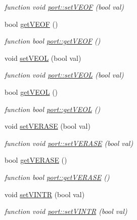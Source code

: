 \begin{DoxyCompactItemize}
\begin{DoxyCompactList}\small\item\em function void \hyperlink{classport_a84c056e9f04f4fd3dc4200f6ba7279de}{port\+::set\+V\+E\+OF} (bool val) \end{DoxyCompactList}\item 
bool \hyperlink{classport_a3dedfb7fd7aaeda7b85bcaaf40c1edc9}{get\+V\+E\+OF} ()
\begin{DoxyCompactList}\small\item\em function bool \hyperlink{classport_a3dedfb7fd7aaeda7b85bcaaf40c1edc9}{port\+::get\+V\+E\+OF} () \end{DoxyCompactList}\item 
void \hyperlink{classport_a99880c2c00863369ea5fa2e3fdfe8474}{set\+V\+E\+OL} (bool val)
\begin{DoxyCompactList}\small\item\em function void \hyperlink{classport_a99880c2c00863369ea5fa2e3fdfe8474}{port\+::set\+V\+E\+OL} (bool val) \end{DoxyCompactList}\item 
bool \hyperlink{classport_a381910916d501b1fde29803731dde7a5}{get\+V\+E\+OL} ()
\begin{DoxyCompactList}\small\item\em function bool \hyperlink{classport_a381910916d501b1fde29803731dde7a5}{port\+::get\+V\+E\+OL} () \end{DoxyCompactList}\item 
void \hyperlink{classport_abadd59db8333dd9793c267e55175a4fd}{set\+V\+E\+R\+A\+SE} (bool val)
\begin{DoxyCompactList}\small\item\em function void \hyperlink{classport_abadd59db8333dd9793c267e55175a4fd}{port\+::set\+V\+E\+R\+A\+SE} (bool val) \end{DoxyCompactList}\item 
bool \hyperlink{classport_a1e814b6f4a98d69126ceb79cc8c89e72}{get\+V\+E\+R\+A\+SE} ()
\begin{DoxyCompactList}\small\item\em function bool \hyperlink{classport_a1e814b6f4a98d69126ceb79cc8c89e72}{port\+::get\+V\+E\+R\+A\+SE} () \end{DoxyCompactList}\item 
void \hyperlink{classport_a3b11cfb6cb43b30329c811aca60e935f}{set\+V\+I\+N\+TR} (bool val)
\begin{DoxyCompactList}\small\item\em function void \hyperlink{classport_a3b11cfb6cb43b30329c811aca60e935f}{port\+::set\+V\+I\+N\+TR} (bool val) \end{DoxyCompactList}\item 

\end{DoxyCompactItemize}

